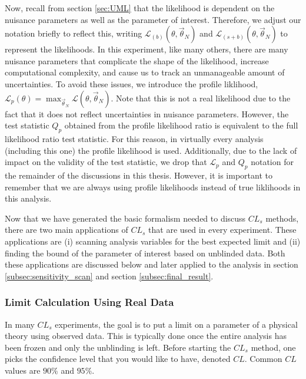 Now, recall from section \ref{sec:UML} that the likelihood is dependent on the nuisance parameters as well as the parameter of interest. Therefore, we adjust our notation briefly to reflect this, writing $\mathcal{L}_{(b)}(\theta, \vec{\theta}_N)$ and $\mathcal{L}_{(s+b)}(\theta, \vec{\theta}_N)$ to represent the likelihoods. In this experiment, like many others, there are many nuisance parameters that complicate the shape of the likelihood, increase computational complexity, and cause us to track an unmanageable amount of uncertainties. To avoid these issues, we introduce the profile liklihood, $\mathcal{L}_p(\theta) = \max_{\vec{\theta}_N} \mathcal{L}(\theta, \vec{\theta}_N)$. Note that this is not a real likelihood due to the fact that it does not reflect uncertainties in nuisance parameters. However, the test statistic $Q_p$ obtained from the profile likelihood ratio is equivalent to the full likelihood ratio test statistic. For this reason, in virtually every analysis (including this one) the profile likelihood is used. Additionally, due to the lack of impact on the validity of the test statistic, we drop that $\mathcal{L}_p$ and $Q_p$ notation for the remainder of the discussions in this thesis. However, it is important to remember that we are always using profile likelihoods instead of true liklihoods in this analysis. 

Now that we have generated the basic formalism needed to discuss $CL_s$ methods, there are two main applications of $CL_s$ that are used in every experiment. These applications are (i) scanning analysis variables for the best expected limit and (ii) finding the bound of the parameter of interest based on unblinded data. Both these applications are discussed below and later applied to the analysis in section \ref{subsec:sensitivity_scan} and section \ref{subsec:final_result}.

\subsubsection{Limit Calculation Using Real Data}
\label{subsubsec:limit_calculation_theory}

In many $CL_s$ experiments, the goal is to put a limit on a parameter of a physical theory using observed data. This is typically done once the entire analysis has been frozen and only the unblinding is left. Before starting the $CL_s$ method, one picks the confidence level that you would like to have, denoted $CL$. Common $CL$ values are $90\%$ and $95\%$. 

